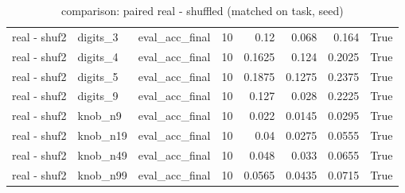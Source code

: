 \begin{table}[t]
\begin{tabular}{lllrrrrr}
real - shuf2 & digits\_3 & eval\_acc\_final & 10 & 0.12 & 0.068 & 0.164 & True \\
real - shuf2 & digits\_4 & eval\_acc\_final & 10 & 0.1625 & 0.124 & 0.2025 & True \\
real - shuf2 & digits\_5 & eval\_acc\_final & 10 & 0.1875 & 0.1275 & 0.2375 & True \\
real - shuf2 & digits\_9 & eval\_acc\_final & 10 & 0.127 & 0.028 & 0.2225 & True \\
real - shuf2 & knob\_n9 & eval\_acc\_final & 10 & 0.022 & 0.0145 & 0.0295 & True \\
real - shuf2 & knob\_n19 & eval\_acc\_final & 10 & 0.04 & 0.0275 & 0.0555 & True \\
real - shuf2 & knob\_n49 & eval\_acc\_final & 10 & 0.048 & 0.033 & 0.0655 & True \\
real - shuf2 & knob\_n99 & eval\_acc\_final & 10 & 0.0565 & 0.0435 & 0.0715 & True \\
\bottomrule
\end{tabular}
\caption{comparison: paired real - shuffled (matched on task, seed)}
\label{tab:wiring_comparison_paired}
\end{table}